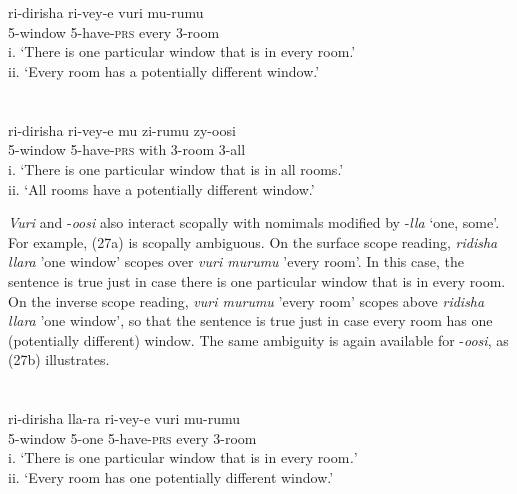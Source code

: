 \documentclass[output=paper]{langsci/langscibook}
\begin{document}
\chapter{}
\chapter{}
\gll ri-dirisha  ri-vey-e  vuri  mu-rumu  \\
     5-window  5-have-\textsc{prs  }every  3-room\\
\glt i. ‘There is one particular window that is in every room.’  \\
ii. ‘Every room has a potentially different window.’  
\z

\chapter{}
\gll ri-dirisha  ri-vey-e  mu  zi-rumu  zy-oosi\\
     5-window  5-have-\textsc{prs  }with  3-room  3-all\\
\glt i. ‘There is one particular window that is in all rooms.’ \\
ii. ‘All rooms have a potentially different window.’        
\z

  \textit{Vuri} and -\textit{oosi} also interact scopally with nomimals modified by -\textit{lla} ‘one, some’. For example, (27a) is scopally ambiguous. On the surface scope reading, \textit{ridisha llara} 'one window' scopes over \textit{vuri murumu }'every room'. In this case, the sentence is true just in case there is one particular window that is in every room. On the inverse scope reading, \textit{vuri murumu }'every room' scopes above \textit{ridisha llara} 'one window', so that the sentence is true just in case every room has one (potentially different) window. The same ambiguity is again available for -\textit{oosi}, as (27b) illustrates.

\chapter{}
\chapter{}
\gll ri-dirisha     lla-ra  ri-vey-e  vuri  mu-rumu  \\
     5-window   5-one  5-have-\textsc{prs  }every  3-room\\
\glt i. ‘There is one particular window that is in every room\textit{.}’\textit{  }\\
ii. ‘Every room has one potentially different window.’       \textit{ }
\z
\end{document}
